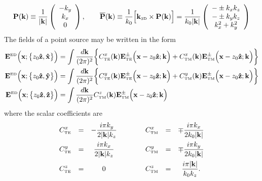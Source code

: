 \documentclass[letterpaper]{article}
\begin{document}
$$ \mathbf{P}(\mathbf{k}) \equiv
   \frac{1}{|\mathbf{k}|}
   \left(\begin{array}{c}-k_y \\ k_x \\ 0 \end{array}\right),
   \qquad
   \overline{\mathbf{P}}(\mathbf{k}) \equiv
   \frac{1}{k_0}\Big[ \mathbf{k}_{\hbox{\tiny{3D}}} \times \mathbf{P}(\mathbf{k}) \Big]
   =
   \frac{1}{k_0 |\mathbf{k}|}
   \left(\begin{array}{c} -\pm k_x k_z \\ -\pm k_y k_z \\ k_x^2 + k_y^2 
         \end{array}\right)
$$
The fields of a point source may be written in the form
\begin{align*}
 \mathbf{E}^{\hbox{\tiny{ED}}}\Big(\mathbf{x}; \big\{ z_0 \mathbf{\hat z}, \mathbf{\hat x} \big\}\Big)
&= \int \frac{d \mathbf{k}}{(2\pi)^2} 
   \bigg\{ C^{x}_{\hbox{\tiny{TE}}}(\mathbf{k})
           \mathbf{E}^\pm_{\hbox{\tiny{TE}}}\Big(\mathbf{x}-z_0\mathbf{\hat z}; \mathbf{k}\Big)
          + 
           C^{x}_{\hbox{\tiny{TM}}}(\mathbf{k})
           \mathbf{E}^\pm_{\hbox{\tiny{TM}}}\Big(\mathbf{x}-z_0\mathbf{\hat z}; \mathbf{k}\Big)
   \bigg\}
\\
 \mathbf{E}^{\hbox{\tiny{ED}}}\Big(\mathbf{x}; \big\{ z_0 \mathbf{\hat z}, \mathbf{\hat y} \big\}\Big)
&= \int \frac{d \mathbf{k}}{(2\pi)^2} 
   \bigg\{ C^{y}_{\hbox{\tiny{TE}}}(\mathbf{k})
           \mathbf{E}^\pm_{\hbox{\tiny{TE}}}\Big(\mathbf{x}-z_0\mathbf{\hat z}; \mathbf{k}\Big)
          + 
           C^{y}_{\hbox{\tiny{TM}}}(\mathbf{k})
           \mathbf{E}^\pm_{\hbox{\tiny{TM}}}\Big(\mathbf{x}-z_0\mathbf{\hat z}; \mathbf{k}\Big)
   \bigg\}
\\
 \mathbf{E}^{\hbox{\tiny{ED}}}\Big(\mathbf{x}; \big\{ z_0 \mathbf{\hat z}, \mathbf{\hat z} \big\}\Big)
&= \int \frac{d \mathbf{k}}{(2\pi)^2} 
           C^{z}_{\hbox{\tiny{TM}}}(\mathbf{k})
           \mathbf{E}^\pm_{\hbox{\tiny{TM}}}\Big(\mathbf{x}-z_0\mathbf{\hat z}; \mathbf{k}\Big)
\end{align*}
where the scalar coefficients are 
$$\begin{array}{ccccccc}
 \displaystyle{ C^{x}_{\hbox{\tiny{TE}}} }
 &=& 
  \displaystyle{ -\frac{ i \pi k_y}{2|\mathbf{k}|k_z} }
 &\qquad&
 \displaystyle{ C^{x}_{\hbox{\tiny{TM}}} }
 &=& 
 \displaystyle{ \mp \frac{ i \pi k_x }{2k_0|\mathbf{k}|} }
\\[10pt]
 \displaystyle{ C^{y}_{\hbox{\tiny{TE}}} }
 &=& 
  \displaystyle{ \frac{ i \pi k_x}{2|\mathbf{k}|k_z} }
 &\qquad&
 \displaystyle{ C^{y}_{\hbox{\tiny{TM}}} }
 &=& 
 \displaystyle{ \mp \frac{ i \pi k_y }{2k_0|\mathbf{k}|} }
\\[10pt]
 \displaystyle{ C^{z}_{\hbox{\tiny{TE}}} }
 &=& 0
 &\qquad&
 \displaystyle{ C^{z}_{\hbox{\tiny{TM}}} }
 &=& \displaystyle{ \frac{ i\pi |\mathbf{k}|  }{k_0 k_z} }.
\end{array}$$
\end{document}
